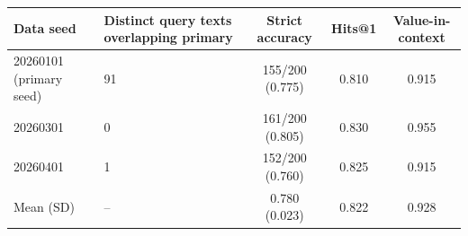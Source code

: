 \begin{tabular}{l p{4.5cm}ccc}
\toprule
Data seed & Distinct query texts overlapping primary & Strict accuracy & Hits@1 & Value-in-context \\
\midrule
20260101 (primary seed) & 91 & 155/200 (0.775) & 0.810 & 0.915 \\
20260301 & 0 & 161/200 (0.805) & 0.830 & 0.955 \\
20260401 & 1 & 152/200 (0.760) & 0.825 & 0.915 \\
Mean (SD) & -- & 0.780 (0.023) & 0.822 & 0.928 \\
\bottomrule
\end{tabular}
